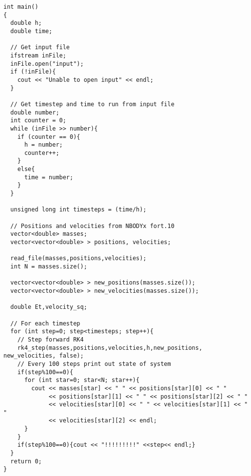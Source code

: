 \documentclass{article}
\begin{document}
\begin{lstlisting}[style=CStyle,firstnumber=1]
int main()
{
  double h;
  double time;

  // Get input file
  ifstream inFile;
  inFile.open("input");
  if (!inFile){
    cout << "Unable to open input" << endl;
  }

  // Get timestep and time to run from input file
  double number;
  int counter = 0;
  while (inFile >> number){
    if (counter == 0){
      h = number;
      counter++;
    }
    else{
      time = number;
    }
  }

  unsigned long int timesteps = (time/h);

  // Positions and velocities from NBODYx fort.10
  vector<double> masses;
  vector<vector<double> > positions, velocities;

  read_file(masses,positions,velocities);
  int N = masses.size();

  vector<vector<double> > new_positions(masses.size());
  vector<vector<double> > new_velocities(masses.size());

  double Et,velocity_sq;

  // For each timestep
  for (int step=0; step<timesteps; step++){
    // Step forward RK4
    rk4_step(masses,positions,velocities,h,new_positions, new_velocities, false);
    // Every 100 steps print out state of system
    if(step%100==0){
      for (int star=0; star<N; star++){
        cout << masses[star] << " " << positions[star][0] << " " 
             << positions[star][1] << " " << positions[star][2] << " "
             << velocities[star][0] << " " << velocities[star][1] << " "
             << velocities[star][2] << endl;
      }
    }
    if(step%100==0){cout << "!!!!!!!!!" <<step<< endl;}
  }
  return 0;
}
\end{lstlisting}
\end{document}

